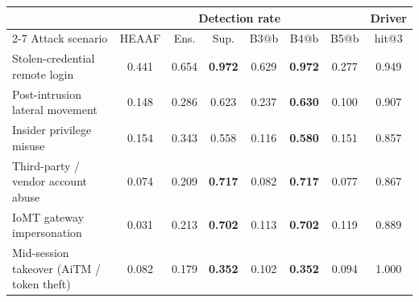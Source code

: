 \begin{tabular}{lccccccc}
\toprule
& \multicolumn{6}{c}{Detection rate} & Driver \\
\cmidrule(lr){2-7}
Attack scenario & HEAAF & Ens. & Sup. & B3@b & B4@b & B5@b & hit@3 \\
\midrule
Stolen-credential remote login & 0.441 & 0.654 & \textbf{0.972} & 0.629 & \textbf{0.972} & 0.277 & 0.949 \\
Post-intrusion lateral movement & 0.148 & 0.286 & 0.623 & 0.237 & \textbf{0.630} & 0.100 & 0.907 \\
Insider privilege misuse & 0.154 & 0.343 & 0.558 & 0.116 & \textbf{0.580} & 0.151 & 0.857 \\
Third-party / vendor account abuse & 0.074 & 0.209 & \textbf{0.717} & 0.082 & \textbf{0.717} & 0.077 & 0.867 \\
IoMT gateway impersonation & 0.031 & 0.213 & \textbf{0.702} & 0.113 & \textbf{0.702} & 0.119 & 0.889 \\
Mid-session takeover (AiTM / token theft) & 0.082 & 0.179 & \textbf{0.352} & 0.102 & \textbf{0.352} & 0.094 & 1.000 \\
\bottomrule
\end{tabular}
